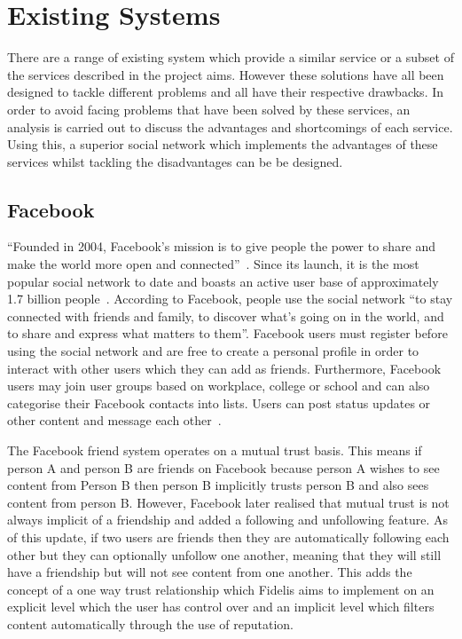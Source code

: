\section{Existing Systems}
There are a range of existing system which provide a similar service or a subset of the services described in the project aims. However these solutions have all been designed to tackle different problems and all have their respective drawbacks. In order to avoid facing problems that have been solved by these services, an analysis is carried out to discuss the advantages and shortcomings of each service. Using this, a superior social network which implements the advantages of these services whilst tackling the disadvantages can be be designed.

\subsection{Facebook}
``Founded in 2004, Facebook's mission is to give people the power to share and make the world more open and connected''~\cite{Facebook:About}. Since its launch, it is the most popular social network to date and boasts an active user base of approximately 1.7 billion people~\cite{Statista:Facebook}. According to Facebook, people use the social network ``to stay connected with friends and family, to discover what's going on in the world, and to share and express what matters to them''. Facebook users must register before using the social network and are free to create a personal profile in order to interact with other users which they can add as friends. Furthermore, Facebook users may join user groups based on workplace, college or school and can also categorise their Facebook contacts into lists. Users can post status updates or other content and message each other~\cite{Statista:Facebook}. 

The Facebook friend system operates on a mutual trust basis. This means if person A and person B are friends on Facebook because person A wishes to see content from Person B then person B implicitly trusts person B and also sees content from person B. However, Facebook later realised that mutual trust is not always implicit of a friendship and added a following and unfollowing feature. As of this update, if two users are friends then they are automatically following each other but they can optionally unfollow one another, meaning that they will still have a friendship but will not see content from one another. This adds the concept of a one way trust relationship which Fidelis aims to implement on an explicit level which the user has control over and an implicit level which filters content automatically through the use of reputation.

